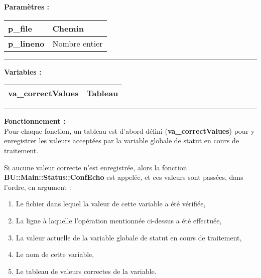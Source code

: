 \documentclass[a4paper,10pt]{article}
\begin{document}
\begin{justify}
    \textbf{Paramètres :}

    \begin{tabular}{|l|l|}
        \hline
        \textbf{\color{vars}p\_file} & Chemin\\
        \hline
        \textbf{\color{vars}p\_lineno} & Nombre entier\\
        \hline
    \end{tabular}
\end{justify}

\setlength{\parskip}{2em}

\par\noindent\rule{\textwidth}{0.4pt}\setlength{\parskip}{1em}

\begin{justify}
    \textbf{Variables :}

    \begin{tabular}{|l|l|}
        \hline
        \textbf{\color{vars}va\_correctValues} & Tableau\\
        \hline
    \end{tabular}
\end{justify}\setlength{\parskip}{1em}


\par\noindent\rule{\textwidth}{0.4pt}

\begin{justify}
    \textbf{Fonctionnement :}\\[1\baselineskip]
    Pour chaque fonction, un tableau est d'abord défini (\textbf{\color{vars}va\_correctValues}) pour y enregistrer les valeurs acceptées par la variable globale de statut en cours de traitement.
\end{justify}

\begin{justify}
    Si aucune valeur correcte n'est enregistrée, alors la fonction \textbf{\color{mauve}BU::Main::Status::ConfEcho} est appelée, et ces valeurs sont passées, dans l'ordre, en argument :
    
    \begin{enumerate}
        \item Le fichier dans lequel la valeur de cette variable a été vérifiée,
        \item La ligne à laquelle l'opération mentionnée ci-dessus a été effectuée,
        \item La valeur actuelle de la variable globale de statut en cours de traitement,
        \item Le nom de cette variable,
        \item Le tableau de valeurs correctes de la variable.
    \end{enumerate}
\end{justify}
\end{document}
